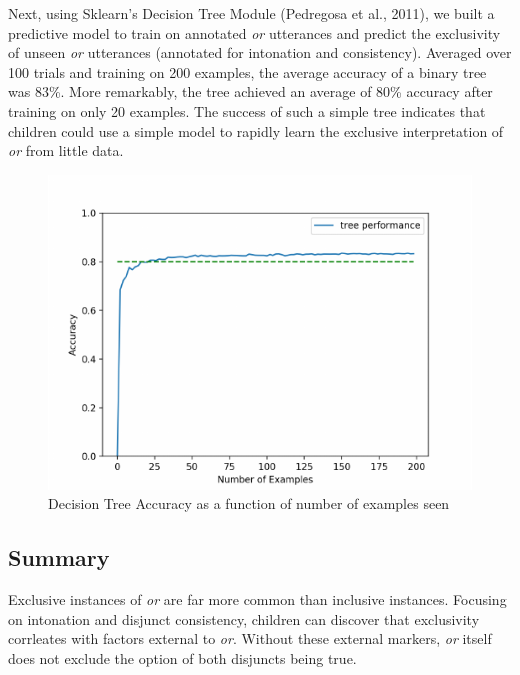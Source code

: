 \documentclass[10pt, letterpaper]{article}
\newenvironment{CodeChunk}{}{}
\begin{document}
Next, using Sklearn's Decision Tree Module (Pedregosa et al., 2011), we
built a predictive model to train on annotated \emph{or} utterances and
predict the exclusivity of unseen \emph{or} utterances (annotated for
intonation and consistency). Averaged over 100 trials and training on
200 examples, the average accuracy of a binary tree was 83\%. More
remarkably, the tree achieved an average of 80\% accuracy after training
on only 20 examples. The success of such a simple tree indicates that
children could use a simple model to rapidly learn the exclusive
interpretation of \emph{or} from little data.

\begin{CodeChunk}
\begin{figure}[t]

{\centering \includegraphics{figs/learningCurve-1} 

}

\caption[Decision Tree Accuracy as a function of number of examples seen]{Decision Tree Accuracy as a function of number of examples seen}\label{fig:learningCurve}
\end{figure}
\end{CodeChunk}

\subsection{Summary}\label{summary-1}

Exclusive instances of \emph{or} are far more common than inclusive
instances. Focusing on intonation and disjunct consistency, children can
discover that exclusivity corrleates with factors external to \emph{or}.
Without these external markers, \emph{or} itself does not exclude the
option of both disjuncts being true.
\end{document}
